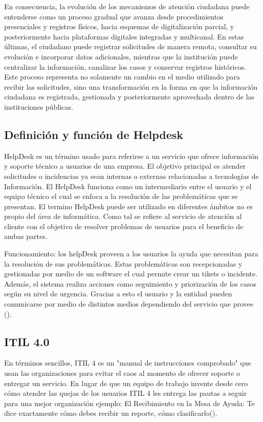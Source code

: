 En consecuencia, la evolución de los mecanismos de atención ciudadana puede entenderse como un proceso gradual que avanza desde procedimientos presenciales y registros físicos, hacia esquemas de digitalización parcial, y posteriormente hacia plataformas digitales integradas y multicanal. En estas últimas, el ciudadano puede registrar solicitudes de manera remota, consultar su evolución e incorporar datos adicionales, mientras que la institución puede centralizar la información, canalizar los casos y conservar registros históricos. Este proceso representa no solamente un cambio en el medio utilizado para recibir las solicitudes, sino una transformación en la forma en que la información ciudadana es registrada, gestionada y posteriormente aprovechada dentro de las instituciones públicas.

\subsection{Definición y función de Helpdesk}
\label{subsec:helpdesk_itil}
HelpDesk es un término usado para referirse a un servicio que ofrece información y soporte técnico a usuarios de una empresa.
El objetivo principal es atender solicitudes o incidencias ya sean internas o externas relacionadas a tecnologías de Información. 
El HelpDesk funciona como un intermediario entre el usuario y el equipo técnico el cual se enfoca a la resolución de las problemáticas que se presentan.
El termino HelpDesk puede ser utilizado en diferentes ámbitos no es propio del área de informática. Como tal se refiere al servicio de atención al cliente con el objetivo de resolver problemas de usuarios para el beneficio de ambas partes.

Funcionamiento: los helpDesk proveen a los usuarios la ayuda que necesitan para la resolución de sus problemáticas. Estas problemáticas son recepcionadas y gestionadas por medio de un software el cual permite crear un tikets o incidente. Además, el sistema realiza acciones como seguimiento y priorización de los casos según su nivel de urgencia. Gracias a esto el usuario y la entidad pueden comunicarse por medio de distintos medios dependiendo del servicio que provee (\cite{murillo2022propuesta}).


\subsection{ITIL 4.0}

En términos sencillos, ITIL 4 es un "manual de instrucciones comprobado" que usan las organizaciones para evitar el caos al momento de ofrecer soporte o entregar un servicio.
En lugar de que un equipo de trabajo invente desde cero cómo atender las quejas de los usuarios ITIL 4 les entrega las pautas a seguir para una mejor organización ejemplo:
El Recibimiento en la Mesa de Ayuda: Te dice exactamente cómo debes recibir un reporte, cómo clasificarlo(\cite{miller2022itil4}).



